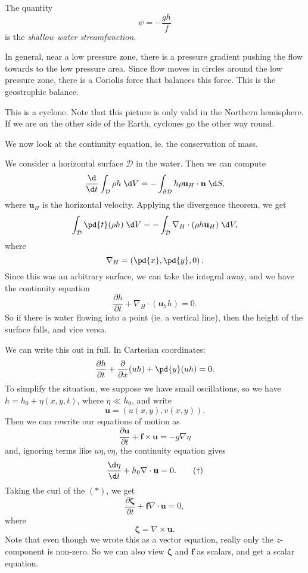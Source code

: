 \documentclass[a4paper]{article}
\begin{document}
\begin{defi}
  The quantity
  \[
    \psi = -\frac{gh}{f}
  \]
  is the \emph{shallow water streamfunction}.
\end{defi}

In general, near a low pressure zone, there is a pressure gradient pushing the flow towards to the low pressure area. Since flow moves in circles around the low pressure zone, there is a Coriolis force that balances this force. This is the geostrophic balance.
\begin{center}
\end{center}
This is a cyclone. Note that this picture is only valid in the Northern hemisphere. If we are on the other side of the Earth, cyclones go the other way round.

We now look at the continuity equation, ie. the conservation of mass.

We consider a horizontal surface $\mathcal{D}$ in the water. Then we can compute
\[
  \frac{\d}{\d t} \int_\mathcal{D} \rho h \;\d V = -\int_{\partial \mathcal{D}} h \rho \mathbf{u}_H \cdot \mathbf{n}\;\d S,
\]
where $\mathbf{u}_H$ is the horizontal velocity. Applying the divergence theorem, we get
\[
  \int_{\mathcal{D}} \pd{t} (\rho h)\;\d V = -\int_{\mathcal{D}} \nabla_H \cdot (\rho h \mathbf{u}_H)\;\d V,
\]
where
\[
  \nabla_H = \left(\pd{x}, \pd{y}, 0\right).
\]
Since this was an arbitrary surface, we can take the integral away, and we have the continuity equation
\[
  \frac{\partial h}{\partial t} + \nabla_H \cdot (\mathbf{u}_h h) = 0.
\]
So if there is water flowing into a point (ie. a vertical line), then the height of the surface falls, and vice versa.

We can write this out in full. In Cartesian coordinates:
\[
  \frac{\partial h}{\partial t} + \frac{\partial}{\partial x}(uh) + \pd{y}(uh) = 0.
\]
To simplify the situation, we suppose we have small oscillations, so we have $h = h_0 + \eta(x, y, t)$, where $\eta \ll h_0$, and write
\[
  \mathbf{u} = (u(x, y), v(x, y)).
\]
Then we can rewrite our equations of motion as
\[
  \frac{\partial \mathbf{u}}{\partial t} + \mathbf{f} \times \mathbf{u} = -g \nabla \eta\tag{$*$}
\]
and, ignoring terms like $u\eta, v\eta$, the continuity equation gives
\[
  \frac{\d \eta}{\d t} + h_0 \nabla \cdot \mathbf{u} = 0.\tag{$\dagger$}
\]
Taking the curl of the $(*)$, we get
\[
  \frac{\partial \boldsymbol\zeta}{\partial t} + \mathbf{f}\nabla \cdot \mathbf{u} = 0,
\]
where
\[
  \boldsymbol\zeta = \nabla \times \mathbf{u}.
\]
Note that even though we wrote this as a vector equation, really only the $z$-component is non-zero. So we can also view $\boldsymbol\zeta$ and $\mathbf{f}$ as scalars, and get a scalar equation.
\end{document}
